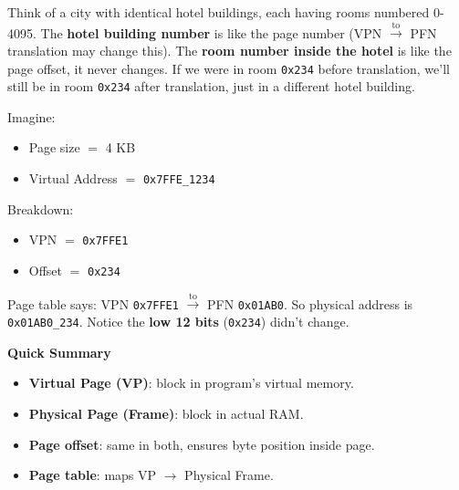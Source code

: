 \begin{remarkbox}
    \highspace
    Think of a city with identical hotel buildings, each having rooms numbered 0-4095. The \textbf{hotel building number} is like the page number (VPN $\xrightarrow{\text{to}}$ PFN translation may change this). The \textbf{room number inside the hotel} is like the page offset, it never changes. If we were in room \texttt{0x234} before translation, we'll still be in room \texttt{0x234} after translation, just in a different hotel building.

    \highspace
    \begin{examplebox}[: Offset]
        Imagine:
        \begin{itemize}
            \item Page size $=$ 4 KB
            \item Virtual Address $=$ \texttt{0x7FFE\_1234}
        \end{itemize}
        Breakdown:
        \begin{itemize}
            \item VPN $=$ \texttt{0x7FFE1}
            \item Offset $=$ \texttt{0x234}
        \end{itemize}
        Page table says: VPN \texttt{0x7FFE1} $\xrightarrow{\text{to}}$ PFN \texttt{0x01AB0}. So physical address is \texttt{0x01AB0\_234}. Notice the \textbf{low 12 bits} (\texttt{0x234}) didn't change.
    \end{examplebox}

    \newpage

    \begin{flushleft}
        \textcolor{Green3}{ \textbf{Quick Summary}}
    \end{flushleft}
    \begin{itemize}
        \item \textbf{Virtual Page (VP)}: block in program's virtual memory.
        \item \textbf{Physical Page (Frame)}: block in actual RAM.
        \item \textbf{Page offset}: same in both, ensures byte position inside page.
        \item \textbf{Page table}: maps VP $\rightarrow$ Physical Frame.
    \end{itemize}


\end{remarkbox}

